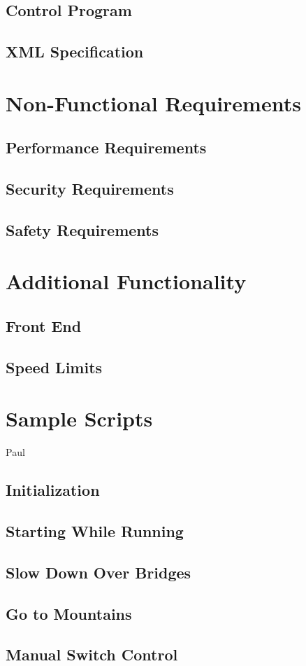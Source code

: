 \documentclass[a4paper,10pt,notitlepage]{article}
\begin{document}
\subsection{Control Program}
\subsection{XML Specification}

\section{Non-Functional Requirements}
\subsection{Performance Requirements}
\subsection{Security Requirements}
\subsection{Safety Requirements}

\section{Additional Functionality}
\subsection{Front End}
\subsection{Speed Limits}

\section{Sample Scripts}
Paul
\subsection{Initialization}
\subsection{Starting While Running}
\subsection{Slow Down Over Bridges}
\subsection{Go to Mountains}
\subsection{Manual Switch Control}
\end{document}
